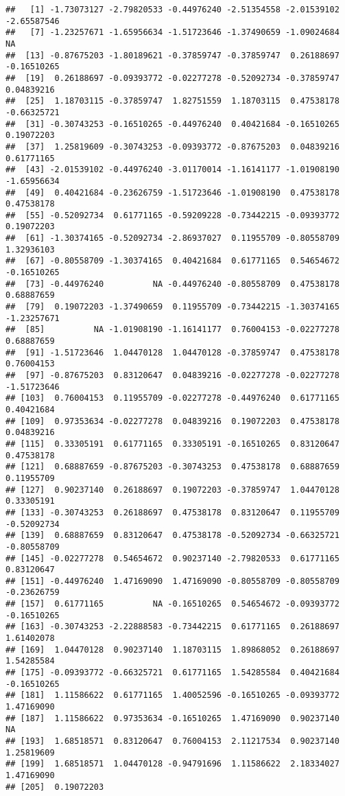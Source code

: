 \documentclass[
]{article}
\begin{document}
\begin{verbatim}
##   [1] -1.73073127 -2.79820533 -0.44976240 -2.51354558 -2.01539102 -2.65587546
##   [7] -1.23257671 -1.65956634 -1.51723646 -1.37490659 -1.09024684          NA
##  [13] -0.87675203 -1.80189621 -0.37859747 -0.37859747  0.26188697 -0.16510265
##  [19]  0.26188697 -0.09393772 -0.02277278 -0.52092734 -0.37859747  0.04839216
##  [25]  1.18703115 -0.37859747  1.82751559  1.18703115  0.47538178 -0.66325721
##  [31] -0.30743253 -0.16510265 -0.44976240  0.40421684 -0.16510265  0.19072203
##  [37]  1.25819609 -0.30743253 -0.09393772 -0.87675203  0.04839216  0.61771165
##  [43] -2.01539102 -0.44976240 -3.01170014 -1.16141177 -1.01908190 -1.65956634
##  [49]  0.40421684 -0.23626759 -1.51723646 -1.01908190  0.47538178  0.47538178
##  [55] -0.52092734  0.61771165 -0.59209228 -0.73442215 -0.09393772  0.19072203
##  [61] -1.30374165 -0.52092734 -2.86937027  0.11955709 -0.80558709  1.32936103
##  [67] -0.80558709 -1.30374165  0.40421684  0.61771165  0.54654672 -0.16510265
##  [73] -0.44976240          NA -0.44976240 -0.80558709  0.47538178  0.68887659
##  [79]  0.19072203 -1.37490659  0.11955709 -0.73442215 -1.30374165 -1.23257671
##  [85]          NA -1.01908190 -1.16141177  0.76004153 -0.02277278  0.68887659
##  [91] -1.51723646  1.04470128  1.04470128 -0.37859747  0.47538178  0.76004153
##  [97] -0.87675203  0.83120647  0.04839216 -0.02277278 -0.02277278 -1.51723646
## [103]  0.76004153  0.11955709 -0.02277278 -0.44976240  0.61771165  0.40421684
## [109]  0.97353634 -0.02277278  0.04839216  0.19072203  0.47538178  0.04839216
## [115]  0.33305191  0.61771165  0.33305191 -0.16510265  0.83120647  0.47538178
## [121]  0.68887659 -0.87675203 -0.30743253  0.47538178  0.68887659  0.11955709
## [127]  0.90237140  0.26188697  0.19072203 -0.37859747  1.04470128  0.33305191
## [133] -0.30743253  0.26188697  0.47538178  0.83120647  0.11955709 -0.52092734
## [139]  0.68887659  0.83120647  0.47538178 -0.52092734 -0.66325721 -0.80558709
## [145] -0.02277278  0.54654672  0.90237140 -2.79820533  0.61771165  0.83120647
## [151] -0.44976240  1.47169090  1.47169090 -0.80558709 -0.80558709 -0.23626759
## [157]  0.61771165          NA -0.16510265  0.54654672 -0.09393772 -0.16510265
## [163] -0.30743253 -2.22888583 -0.73442215  0.61771165  0.26188697  1.61402078
## [169]  1.04470128  0.90237140  1.18703115  1.89868052  0.26188697  1.54285584
## [175] -0.09393772 -0.66325721  0.61771165  1.54285584  0.40421684 -0.16510265
## [181]  1.11586622  0.61771165  1.40052596 -0.16510265 -0.09393772  1.47169090
## [187]  1.11586622  0.97353634 -0.16510265  1.47169090  0.90237140          NA
## [193]  1.68518571  0.83120647  0.76004153  2.11217534  0.90237140  1.25819609
## [199]  1.68518571  1.04470128 -0.94791696  1.11586622  2.18334027  1.47169090
## [205]  0.19072203
\end{verbatim}
\end{document}

